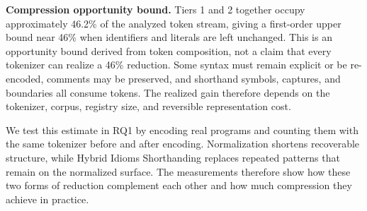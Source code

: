 \textbf{Compression opportunity bound.} Tiers 1 and 2 together occupy approximately 46.2\% of the analyzed token stream, giving a first-order upper bound near 46\% when identifiers and literals are left unchanged. This is an opportunity bound derived from token composition, not a claim that every tokenizer can realize a 46\% reduction. Some syntax must remain explicit or be re-encoded, comments may be preserved, and shorthand symbols, captures, and boundaries all consume tokens. The realized gain therefore depends on the tokenizer, corpus, registry size, and reversible representation cost.

We test this estimate in RQ1 by encoding real programs and counting them with the same tokenizer before and after encoding. Normalization shortens recoverable structure, while Hybrid Idioms Shorthanding replaces repeated patterns that remain on the normalized surface. The measurements therefore show how these two forms of reduction complement each other and how much compression they achieve in practice.
